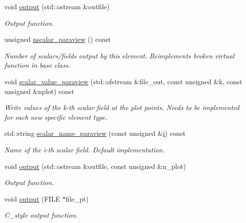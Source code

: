 \begin{DoxyCompactItemize}
void \hyperlink{classoomph_1_1AxisymmetricNavierStokesTractionElement_afec508c380a63dc12a95317224c85553}{output} (std\+::ostream \&outfile)
\begin{DoxyCompactList}\small\item\em Output function. \end{DoxyCompactList}\item 
unsigned \hyperlink{classoomph_1_1AxisymmetricNavierStokesTractionElement_a31a8ab8cc6b231e524ba0329b0cb7e78}{nscalar\+\_\+paraview} () const
\begin{DoxyCompactList}\small\item\em Number of scalars/fields output by this element. Reimplements broken virtual function in base class. \end{DoxyCompactList}\item 
void \hyperlink{classoomph_1_1AxisymmetricNavierStokesTractionElement_a0d4062b2db66d2a14eaa9c270eb034d6}{scalar\+\_\+value\+\_\+paraview} (std\+::ofstream \&file\+\_\+out, const unsigned \&k, const unsigned \&nplot) const
\begin{DoxyCompactList}\small\item\em Write values of the k-\/th scalar field at the plot points. Needs to be implemented for each new specific element type. \end{DoxyCompactList}\item 
std\+::string \hyperlink{classoomph_1_1AxisymmetricNavierStokesTractionElement_a4ca57102287a03de1ee8c4f7f9ef1072}{scalar\+\_\+name\+\_\+paraview} (const unsigned \&\hyperlink{cfortran_8h_adb50e893b86b3e55e751a42eab3cba82}{i}) const
\begin{DoxyCompactList}\small\item\em Name of the i-\/th scalar field. Default implementation. \end{DoxyCompactList}\item 
void \hyperlink{classoomph_1_1AxisymmetricNavierStokesTractionElement_a903801e976db27eb831a17349838877d}{output} (std\+::ostream \&outfile, const unsigned \&n\+\_\+plot)
\begin{DoxyCompactList}\small\item\em Output function. \end{DoxyCompactList}\item 
void \hyperlink{classoomph_1_1AxisymmetricNavierStokesTractionElement_aa264b6b88ec62adffd928382c82e93b4}{output} (F\+I\+LE $\ast$file\+\_\+pt)
\begin{DoxyCompactList}\small\item\em C\+\_\+style output function. \end{DoxyCompactList}\item 

\end{DoxyCompactItemize}
